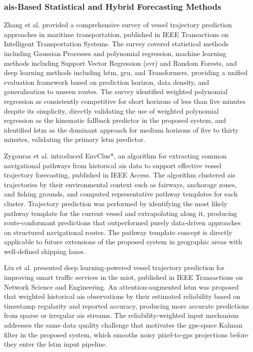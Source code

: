 \subsubsection{\textbf{\gls{ais}-Based Statistical and Hybrid Forecasting Methods}}
Zhang et al. \cite{Zhang2022} provided a comprehensive survey of vessel trajectory
prediction approaches in maritime transportation, published in IEEE Transactions on
Intelligent Transportation Systems. The survey covered statistical methods including
Gaussian Processes and polynomial regression, machine learning methods including
Support Vector Regression (\gls{svr}) and Random Forests, and deep learning methods
including \gls{lstm}, \gls{gru}, and Transformers, providing a unified evaluation framework
based on prediction horizon, data density, and generalisation to unseen routes.
The survey identified weighted polynomial regression as consistently competitive
for short horizons of less than five minutes despite its simplicity, directly
validating the use of weighted polynomial regression as the kinematic fallback
predictor in the proposed system, and identified \gls{lstm} as the dominant approach for
medium horizons of five to thirty minutes, validating the primary \gls{lstm} predictor.
 
Zygouras et al. \cite{Zygouras2024} introduced EnvClus*, an algorithm for
extracting common navigational pathways from historical \gls{ais} data to support
effective vessel trajectory forecasting, published in IEEE Access. The algorithm
clustered \gls{ais} trajectories by their environmental context such as fairways,
anchorage zones, and fishing grounds, and computed representative pathway templates
for each cluster. Trajectory prediction was performed by identifying the most
likely pathway template for the current vessel and extrapolating along it, producing
route-conformant predictions that outperformed purely data-driven approaches on
structured navigational routes. The pathway template concept is directly applicable
to future extensions of the proposed system in geographic areas with well-defined
shipping lanes.
 
Liu et al. \cite{Liu2022} presented deep learning-powered vessel trajectory
prediction for improving smart traffic services in the \gls{miot}, published in IEEE Transactions on Network Science and Engineering. An
attention-augmented \gls{lstm} was proposed that weighted historical \gls{ais} observations
by their estimated reliability based on timestamp regularity and reported accuracy,
producing more accurate predictions from sparse or irregular \gls{ais} streams. The
reliability-weighted input mechanism addresses the same data quality challenge
that motivates the \gls{gps}-space Kalman filter in the proposed system, which smooths
noisy pixel-to-\gls{gps} projections before they enter the \gls{lstm} input pipeline.
 
